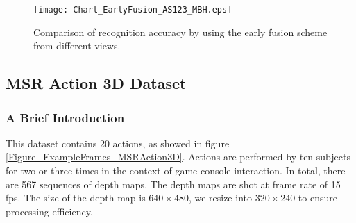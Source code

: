 \documentclass[final,3p,times,twocolumn]{elsarticle}
\begin{document}
\begin{figure}[h]
	\begin{center}
		\texttt{[image: Chart\_EarlyFusion\_AS123\_MBH.eps]}
	\end{center}
	\caption{\label{lbl:Figure_EarlyFusion_AS123_MBH}Comparison of recognition accuracy by using the early fusion scheme from different views.}
\end{figure}

\subsection{MSR Action 3D Dataset}

\subsubsection{A Brief Introduction}
This dataset \cite{li2010action} contains 20 actions, as showed in figure \ref{Figure_ExampleFrames_MSRAction3D}. Actions are performed by ten subjects for two or three times in the context of game console interaction. In total, there are 567 sequences of depth maps. The depth maps are shot at frame rate of 15 fps. The size of the depth map is $640 \times 480$, we resize into $320 \times 240$ to ensure processing efficiency.
\end{document}
